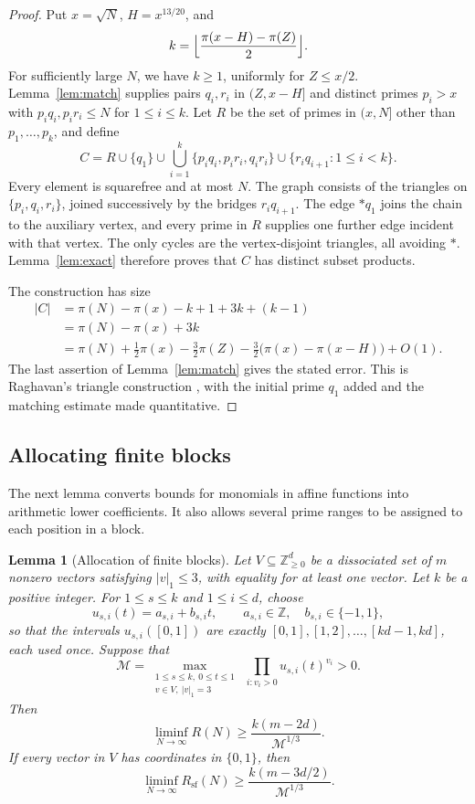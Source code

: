 \documentclass[11pt]{article}
\numberwithin{equation}{section}
\newtheorem{lemma}[theorem]{Lemma}
\theoremstyle{remark}
\newcommand{\Z}{\mathbb{Z}}
\begin{document}
\begin{proof}
Put $x=\sqrt N$, $H=x^{13/20}$, and
\[
k=\Bigl\lfloor\frac{\pi(x-H)-\pi(Z)}2\Bigr\rfloor.
\]
For sufficiently large $N$, we have $k\ge1$, uniformly for $Z\le x/2$. Lemma~\ref{lem:match} supplies pairs $q_i,r_i$ in $(Z,x-H]$ and distinct primes $p_i>x$ with $p_iq_i,p_ir_i\le N$ for $1\le i\le k$. Let $R$ be the set of primes in $(x,N]$ other than $p_1,\dots,p_k$, and define
\begin{equation}\label{eq:C}
C=R\cup\{q_1\}\cup\bigcup_{i=1}^k\{p_iq_i,p_ir_i,q_ir_i\}\cup\{r_iq_{i+1}:1\le i<k\}.
\end{equation}
Every element is squarefree and at most $N$. The graph consists of the triangles on $\{p_i,q_i,r_i\}$, joined successively by the bridges $r_iq_{i+1}$. The edge $*q_1$ joins the chain to the auxiliary vertex, and every prime in $R$ supplies one further edge incident with that vertex. The only cycles are the vertex-disjoint triangles, all avoiding $*$. Lemma~\ref{lem:exact} therefore proves that $C$ has distinct subset products.

The construction has size
\begin{align*}
|C|&=\pi(N)-\pi(x)-k+1+3k+(k-1)\\
&=\pi(N)-\pi(x)+3k\\
&=\pi(N)+\tfrac12\pi(x)-\tfrac32\pi(Z)-\tfrac32\bigl(\pi(x)-\pi(x-H)\bigr)+O(1).
\end{align*}
The last assertion of Lemma~\ref{lem:match} gives the stated error. This is Raghavan's triangle construction \cite[proof of Theorem~1.6]{Raghavan}, with the initial prime $q_1$ added and the matching estimate made quantitative.
\end{proof}

\subsection{Allocating finite blocks}
The next lemma converts bounds for monomials in affine functions into arithmetic lower coefficients. It also allows several prime ranges to be assigned to each position in a block.

\begin{lemma}[Allocation of finite blocks]\label{lem:alloc}
Let $V\subseteq\Z_{\ge0}^d$ be a dissociated set of $m$ nonzero vectors satisfying $|v|_1\le3$, with equality for at least one vector. Let $k$ be a positive integer. For $1\le s\le k$ and $1\le i\le d$, choose
\[
u_{s,i}(t)=a_{s,i}+b_{s,i}t,\qquad a_{s,i}\in\Z,\quad b_{s,i}\in\{-1,1\},
\]
so that the intervals $u_{s,i}([0,1])$ are exactly $[0,1],[1,2],\dots,[kd-1,kd]$, each used once. Suppose that
\[
\mathcal M=\max_{\substack{1\le s\le k,\ 0\le t\le1\\ v\in V,\ |v|_1=3}}\ \prod_{i:v_i>0}u_{s,i}(t)^{v_i}>0.
\]
Then
\[
\liminf_{N\to\infty}R(N)\ge\frac{k(m-2d)}{\mathcal M^{1/3}}.
\]
If every vector in $V$ has coordinates in $\{0,1\}$, then
\[
\liminf_{N\to\infty}R_{\mathrm{sf}}(N)\ge\frac{k(m-3d/2)}{\mathcal M^{1/3}}.
\]
\end{lemma}
\end{document}
